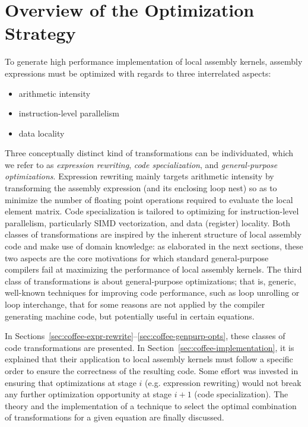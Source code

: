 
\section{Overview of the Optimization Strategy}

To generate high performance implementation of local assembly kernels, assembly expressions must be optimized with regards to three interrelated aspects: 
\begin{itemize}
\item arithmetic intensity
\item instruction-level parallelism
\item data locality
\end{itemize}
Three conceptually distinct kind of transformations can be individuated, which we refer to as \textit{expression rewriting}, \textit{code specialization}, and \textit{general-purpose optimizations}. Expression rewriting mainly targets arithmetic intensity by transforming the assembly expression (and its enclosing loop nest) so as to minimize the number of floating point operations required to evaluate the local element matrix. Code specialization is tailored to optimizing for instruction-level parallelism, particularly SIMD vectorization, and data (register) locality. Both classes of transformations are inspired by the inherent structure of local assembly code and make use of domain knowledge: as elaborated in the next sections, these two aspects are the core motivations for which standard general-purpose compilers fail at maximizing the performance of local assembly kernels. The third class of transformations is about general-purpose optimizations; that is, generic, well-known techniques for improving code performance, such as loop unrolling or loop interchange, that for some reasons are not applied by the compiler generating machine code, but potentially useful in certain equations.

In Sections~\ref{sec:coffee-expr-rewrite}--\ref{sec:coffee-genpurp-opts}, these classes of code transformations are presented. In Section~\ref{sec:coffee-implementation}, it is explained that their application to local assembly kernels must follow a specific order to ensure the correctness of the resulting code. Some effort was invested in ensuring that optimizations at stage $i$ (e.g. expression rewriting) would not break any further optimization opportunity at stage $i+1$ (code specialization). The theory and the implementation of a technique to select the optimal combination of transformations for a given equation are finally discussed.

